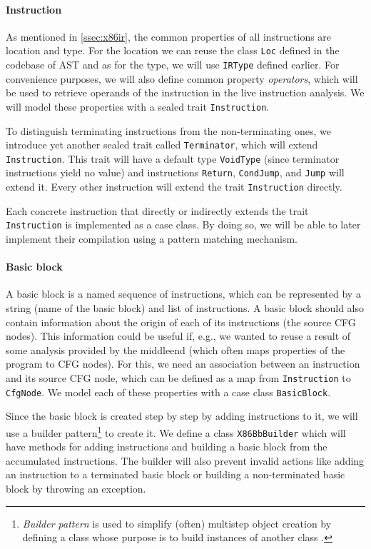 \documentclass[thesis=M,english]{FITthesis}[2019/12/23]
\begin{document}
\paragraph*{Instruction} As mentioned in \autoref{ssec:x86ir}, the common properties of all instructions are location and type. For the location we can reuse the class \texttt{Loc} defined in the codebase of AST and as for the type, we will use \texttt{IRType} defined earlier. For convenience purposes, we will also define common property \emph{operators}, which will be used to retrieve operands of the instruction in the live instruction analysis. We will model these properties with a sealed trait \texttt{Instruction}.

To distinguish terminating instructions from the non-terminating ones, we introduce yet another sealed trait called \texttt{Terminator}, which will extend \texttt{Instruction}. This trait will have a default type \texttt{VoidType} (since terminator instructions yield no value) and instructions \texttt{Return}, \texttt{CondJump}, and \texttt{Jump} will extend it. Every other instruction will extend the trait \texttt{Instruction} directly.

Each concrete instruction that directly or indirectly extends the trait \texttt{Instruction} is implemented as a case class. By doing so, we will be able to later implement their compilation using a pattern matching mechanism.

\paragraph*{Basic block} A basic block is a named sequence of instructions, which can be represented by a string (name of the basic block) and list of instructions. A basic block should also contain information about the origin of each of its instructions (the source CFG nodes). This information could be useful if, e.g., we wanted to reuse a result of some analysis provided by the middleend (which often maps properties of the program to CFG nodes). For this, we need an association between an instruction and its source CFG node, which can be defined as a map from \texttt{Instruction} to \texttt{CfgNode}. We model each of these properties with a case class \texttt{BasicBlock}.

Since the basic block is created step by step by adding instructions to it, we will use a builder pattern\footnote{\emph{Builder pattern} is used to simplify (often) multistep object creation by defining a class whose purpose is to build instances of another class \cite[Chap. 1]{java_pattern}.} to create it. We define a class \texttt{X86BbBuilder} which will have methods for adding instructions and building a basic block from the accumulated instructions. The builder will also prevent invalid actions like adding an instruction to a terminated basic block or building a non-terminated basic block by throwing an exception.
\end{document}
